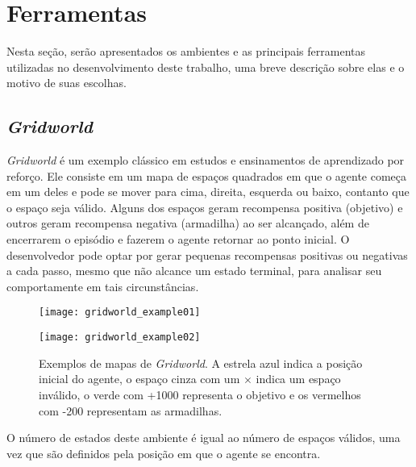 \section{Ferramentas}
\label{sec:tools}
Nesta seção, serão apresentados os ambientes e as principais ferramentas utilizadas no desenvolvimento deste trabalho, uma breve descrição sobre elas e o motivo de suas escolhas.

\subsection{\textit{Gridworld}}
\label{sec:gridworld}

\textit{Gridworld} é um exemplo clássico em estudos e ensinamentos de aprendizado por reforço.
Ele consiste em um mapa de espaços quadrados em que o agente começa em um deles e pode se mover para cima, direita, esquerda ou baixo, contanto que o espaço seja válido.
Alguns dos espaços geram recompensa positiva (objetivo) e outros geram recompensa negativa (armadilha) ao ser alcançado, além de encerrarem o episódio e fazerem o agente retornar ao ponto inicial.
O desenvolvedor pode optar por gerar pequenas recompensas positivas ou negativas a cada passo, mesmo que não alcance um estado terminal, para analisar seu comportamente em tais circunstâncias.

\begin{figure}[h!]
  \begin{minipage}[b]{.6\textwidth}
  \centering
  \texttt{[image: gridworld\_example01]}
  \end{minipage}
  \hfill
  \begin{minipage}[b]{.35\textwidth}
  \texttt{[image: gridworld\_example02]}
  \end{minipage}
  \centering
  \caption{Exemplos de mapas de \textit{Gridworld}. A estrela azul indica a posição inicial do agente, o espaço cinza com um $\times$ indica um espaço inválido, o verde com +1000 representa o objetivo e os vermelhos com -200 representam as armadilhas.}
\end{figure}

O número de estados deste ambiente é igual ao número de espaços válidos, uma vez que são definidos pela posição em que o agente se encontra.

